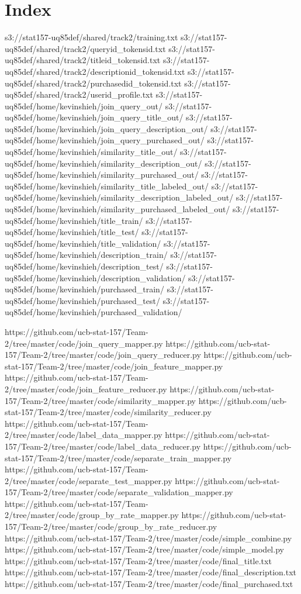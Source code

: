 \documentclass[11pt]{article}
\begin{document}
\newpage
\section*{Index}
\begin{spverbatim}
s3://stat157-uq85def/shared/track2/training.txt
s3://stat157-uq85def/shared/track2/queryid_tokensid.txt
s3://stat157-uq85def/shared/track2/titleid_tokensid.txt
s3://stat157-uq85def/shared/track2/descriptionid_tokensid.txt
s3://stat157-uq85def/shared/track2/purchasedid_tokensid.txt
s3://stat157-uq85def/shared/track2/userid_profile.txt
s3://stat157-uq85def/home/kevinshieh/join_query_out/
s3://stat157-uq85def/home/kevinshieh/join_query_title_out/
s3://stat157-uq85def/home/kevinshieh/join_query_description_out/
s3://stat157-uq85def/home/kevinshieh/join_query_purchased_out/
s3://stat157-uq85def/home/kevinshieh/similarity_title_out/
s3://stat157-uq85def/home/kevinshieh/similarity_description_out/
s3://stat157-uq85def/home/kevinshieh/similarity_purchased_out/
s3://stat157-uq85def/home/kevinshieh/similarity_title_labeled_out/
s3://stat157-uq85def/home/kevinshieh/similarity_description_labeled_out/
s3://stat157-uq85def/home/kevinshieh/similarity_purchased_labeled_out/
s3://stat157-uq85def/home/kevinshieh/title_train/
s3://stat157-uq85def/home/kevinshieh/title_test/
s3://stat157-uq85def/home/kevinshieh/title_validation/
s3://stat157-uq85def/home/kevinshieh/description_train/
s3://stat157-uq85def/home/kevinshieh/description_test/
s3://stat157-uq85def/home/kevinshieh/description_validation/
s3://stat157-uq85def/home/kevinshieh/purchased_train/
s3://stat157-uq85def/home/kevinshieh/purchased_test/
s3://stat157-uq85def/home/kevinshieh/purchased_validation/

https://github.com/ucb-stat-157/Team-2/tree/master/code/join_query_mapper.py
https://github.com/ucb-stat-157/Team-2/tree/master/code/join_query_reducer.py
https://github.com/ucb-stat-157/Team-2/tree/master/code/join_feature_mapper.py
https://github.com/ucb-stat-157/Team-2/tree/master/code/join_feature_reducer.py
https://github.com/ucb-stat-157/Team-2/tree/master/code/similarity_mapper.py
https://github.com/ucb-stat-157/Team-2/tree/master/code/similarity_reducer.py
https://github.com/ucb-stat-157/Team-2/tree/master/code/label_data_mapper.py
https://github.com/ucb-stat-157/Team-2/tree/master/code/label_data_reducer.py
https://github.com/ucb-stat-157/Team-2/tree/master/code/separate_train_mapper.py
https://github.com/ucb-stat-157/Team-2/tree/master/code/separate_test_mapper.py
https://github.com/ucb-stat-157/Team-2/tree/master/code/separate_validation_mapper.py
https://github.com/ucb-stat-157/Team-2/tree/master/code/group_by_rate_mapper.py
https://github.com/ucb-stat-157/Team-2/tree/master/code/group_by_rate_reducer.py
https://github.com/ucb-stat-157/Team-2/tree/master/code/simple_combine.py
https://github.com/ucb-stat-157/Team-2/tree/master/code/simple_model.py
https://github.com/ucb-stat-157/Team-2/tree/master/code/final_title.txt
https://github.com/ucb-stat-157/Team-2/tree/master/code/final_description.txt
https://github.com/ucb-stat-157/Team-2/tree/master/code/final_purchased.txt
\end{spverbatim}
\end{document}
